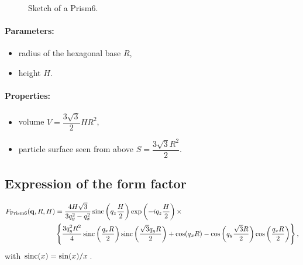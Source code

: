 \begin{figure}[ht]
\hfill
{}
\hfill
{}
\hfill
\caption{Sketch of a Prism6.}
\label{fig:prism6}
\end{figure}

\FloatBarrier

\paragraph{Parameters:}
\begin{itemize}
\item radius of the hexagonal base $R$,
\item height $H$.
\end{itemize}

\paragraph{Properties:}
\begin{itemize}
\item volume $V = \dfrac{3\sqrt{3}}{2}H R^2$,
\item particle surface seen from above $S =\dfrac{3\sqrt{3}R^2}{2}$.
\end{itemize}

\subsection{Expression of the form factor}
\begin{align*}
F_{\rm{Prism6}}(\mathbf{q}, R, H) &= \frac{4H\sqrt{3}}{3q_y^2 - q_x^2}
\operatorname{sinc}\left(q_z\frac{H}{2}\right) \exp\left(-i q_z\frac{ H}{2}\right)\times\\
&\left\{\frac{3q_y^2R^2}{4} \operatorname{sinc}\left(\frac{q_x
  R}{2}\right)\operatorname{sinc}\left(\frac{\sqrt{3}q_yR }{2}\right)+ \cos(q_x R)-\cos\left(q_y
\frac{\sqrt{3}R}{2}\right) \cos\left(\frac{q_x R}{2}\right)\right\},
\end{align*}
with $\operatorname{sinc}(x)=\sin(x)/x$.

